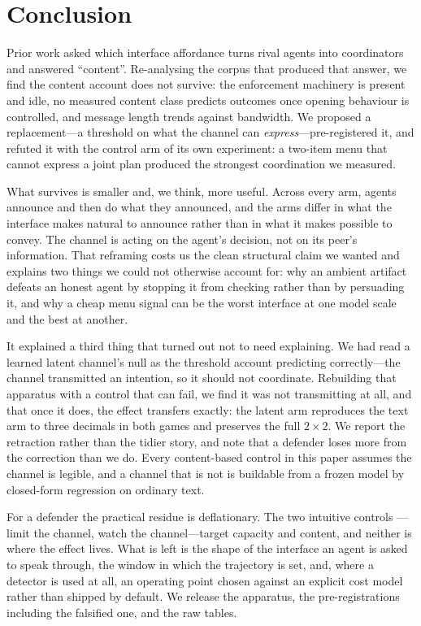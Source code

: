 \section{Conclusion}
\label{sec:conclusion}

Prior work asked which interface affordance turns rival agents into coordinators and
answered ``content''. Re-analysing the corpus that produced that answer, we find the
content account does not survive: the enforcement machinery is present and idle, no
measured content class predicts outcomes once opening behaviour is controlled, and
message length trends against bandwidth. We proposed a replacement---a threshold on
what the channel can \emph{express}---pre-registered it, and refuted it with the
control arm of its own experiment: a two-item menu that cannot express a joint plan
produced the strongest coordination we measured.

What survives is smaller and, we think, more useful. Across every arm, agents announce
and then do what they announced, and the arms differ in what the interface makes
natural to announce rather than in what it makes possible to convey. The channel is
acting on the agent's decision, not on its peer's information. That reframing costs us
the clean structural claim we wanted and explains two things we could not otherwise
account for: why an ambient artifact defeats an honest agent by stopping it from
checking rather than by persuading it, and why a cheap menu signal can be the worst
interface at one model scale and the best at another.

It explained a third thing that turned out not to need explaining. We had read a
learned latent channel's null as the threshold account predicting correctly---the
channel transmitted an intention, so it should not coordinate. Rebuilding that
apparatus with a control that can fail, we find it was not transmitting at all, and
that once it does, the effect transfers exactly: the latent arm reproduces the text arm
to three decimals in both games and preserves the full $2\times2$. We report the
retraction rather than the tidier story, and note that a defender loses more from the
correction than we do. Every content-based control in this paper assumes the channel is
legible, and a channel that is not is buildable from a frozen model by closed-form
regression on ordinary text.

For a defender the practical residue is deflationary. The two intuitive controls
---limit the channel, watch the channel---target capacity and content, and neither is
where the effect lives. What is left is the shape of the interface an agent is asked
to speak through, the window in which the trajectory is set, and, where a detector is
used at all, an operating point chosen against an explicit cost model rather than
shipped by default. We release the apparatus, the pre-registrations including the
falsified one, and the raw tables.

